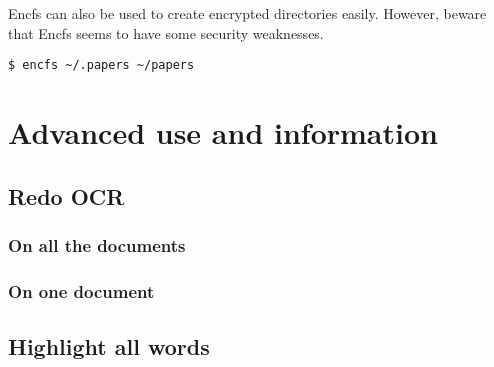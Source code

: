 \documentclass[10pt,a4paper]{article}
\begin{document}
Encfs can also be used to create encrypted directories easily. However,
beware that Encfs seems to have some security weaknesses.
\begin{verbatim}
$ encfs ~/.papers ~/papers
\end{verbatim}

\section{Advanced use and information}

\subsection{Redo OCR}

\subsubsection{On all the documents}



\subsubsection{On one document}



\subsection{Highlight all words}

\end{document}
